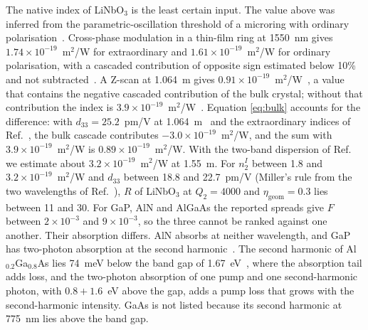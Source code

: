 \documentclass[9pt]{osa-supplemental-document}
\newcommand{\etag}{\eta_{\mathrm{geom}}}
\begin{document}
The native index of LiNbO$_3$ is the least certain input.  The value
above was inferred from the parametric-oscillation threshold of a
microring with ordinary polarisation~\cite{he2019}.  Cross-phase
modulation in a thin-film ring at 1550~nm gives
$1.74\times10^{-19}$~m$^2$/W for extraordinary and
$1.61\times10^{-19}$~m$^2$/W for ordinary polarisation, with a cascaded
contribution of opposite sign estimated below 10\% and not
subtracted~\cite{shamsansari2022}.  A Z-scan at
1.064~\textmu m gives $0.91\times10^{-19}$~m$^2$/W~\cite{desalvo1996}, a
value that contains the negative cascaded contribution of the bulk
crystal; without that contribution the index is
$3.9\times10^{-19}$~m$^2$/W~\cite{phillips2011,bache2012}.  Equation
\eqref{eq:bulk} accounts for the difference: with $d_{33}=25.2$~pm/V at
1.064~\textmu m~\cite{shoji1997} and the extraordinary indices of
Ref.~\cite{zelmon1997}, the bulk cascade contributes
$-3.0\times10^{-19}$~m$^2$/W, and the sum with $3.9\times10^{-19}$~m$^2$/W
is $0.89\times10^{-19}$~m$^2$/W.  With the two-band
dispersion of Ref.~\cite{sheikbahae1991} we estimate about
$3.2\times10^{-19}$~m$^2$/W at 1.55~\textmu m.  For $n_2^I$ between 1.8
and $3.2\times10^{-19}$~m$^2$/W and $d_{33}$ between 18.8 and 22.7~pm/V
(Miller's rule from the two wavelengths of Ref.~\cite{shoji1997}), $R$ of
LiNbO$_3$ at $Q_2=4000$ and $\etag=0.3$ lies between 11 and 30.  For GaP, AlN and AlGaAs the reported spreads give $F$
between $2\times10^{-3}$ and $9\times10^{-3}$, so the three cannot be ranked
against one another.  Their absorption differs.  AlN absorbs at
neither wavelength, and GaP has two-photon absorption at the second
harmonic~\cite{vermeulen2023}.  The second harmonic of
Al$_{0.2}$Ga$_{0.8}$As lies 74~meV below the band gap of
1.67~eV~\cite{adachi1985}, where the absorption tail adds loss, and the
two-photon absorption of one pump and one second-harmonic photon, with
$0.8+1.6$~eV above the gap, adds a pump loss that grows with the
second-harmonic intensity.  GaAs is not
listed because its second harmonic at 775~nm lies above the band gap.
\end{document}

